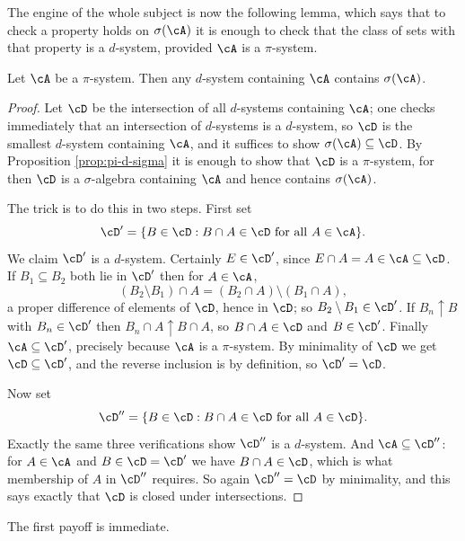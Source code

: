 The engine of the whole subject is now the following lemma, which says that to check a property holds on $\sigma(\cA)$ it is enough to check that the class of sets with that property is a $d$-system, provided $\cA$ is a $\pi$-system.

\begin{lemma}\label{lem:dynkin}
	Let $\cA$ be a $\pi$-system. Then any $d$-system containing $\cA$ contains $\sigma(\cA)$.
\end{lemma}
\begin{proof}
	Let $\cD$ be the intersection of all $d$-systems containing $\cA$; one checks immediately that an intersection of $d$-systems is a $d$-system, so $\cD$ is the smallest $d$-system containing $\cA$, and it suffices to show $\sigma(\cA) \subseteq \cD$. By Proposition \ref{prop:pi-d-sigma} it is enough to show that $\cD$ is a $\pi$-system, for then $\cD$ is a $\sigma$-algebra containing $\cA$ and hence contains $\sigma(\cA)$.

	The trick is to do this in two steps. First set
	$$
	\cD' = \{ B \in \cD : B \cap A \in \cD \text{ for all } A \in \cA \}.
	$$
	We claim $\cD'$ is a $d$-system. Certainly $E \in \cD'$, since $E \cap A = A \in \cA \subseteq \cD$. If $B_1 \subseteq B_2$ both lie in $\cD'$ then for $A \in \cA$,
	$$
	(B_2 \setminus B_1) \cap A = (B_2 \cap A) \setminus (B_1 \cap A),
	$$
	a proper difference of elements of $\cD$, hence in $\cD$; so $B_2 \setminus B_1 \in \cD'$. If $B_n \uparrow B$ with $B_n \in \cD'$ then $B_n \cap A \uparrow B \cap A$, so $B \cap A \in \cD$ and $B \in \cD'$. Finally $\cA \subseteq \cD'$, precisely because $\cA$ is a $\pi$-system. By minimality of $\cD$ we get $\cD \subseteq \cD'$, and the reverse inclusion is by definition, so $\cD' = \cD$.

	Now set
	$$
	\cD'' = \{ B \in \cD : B \cap A \in \cD \text{ for all } A \in \cD \}.
	$$
	Exactly the same three verifications show $\cD''$ is a $d$-system. And $\cA \subseteq \cD''$: for $A \in \cA$ and $B \in \cD = \cD'$ we have $B \cap A \in \cD$, which is what membership of $A$ in $\cD''$ requires. So again $\cD'' = \cD$ by minimality, and this says exactly that $\cD$ is closed under intersections.
\end{proof}

The first payoff is immediate.

